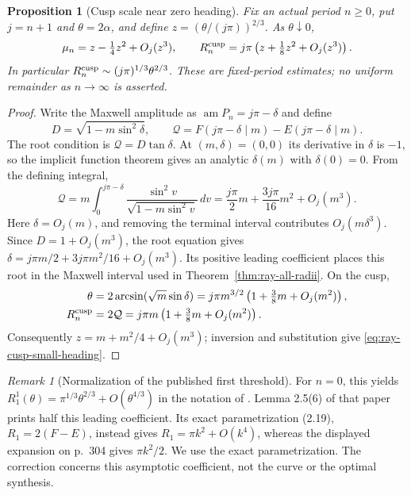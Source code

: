 \documentclass[11pt,a4paper]{article}
\newtheorem{proposition}[theorem]{Proposition}
\theoremstyle{remark}\newtheorem{remark}[theorem]{Remark}
\begin{document}
\begin{proposition}[Cusp scale near zero heading]\label{prop:ray-cusp-scale}
Fix an actual period $n\ge0$, put $j=n+1$ and $\theta=2\alpha$,
and define $z=(\theta/(j\pi))^{2/3}$. As $\theta\downarrow0$,
\begin{equation}\label{eq:ray-cusp-small-heading}
 \mu_n=z-\tfrac14z^2+O_j(z^3),\qquad
 R_n^{\rm cusp}=j\pi\left(z+\tfrac18z^2+O_j(z^3)\right).
\end{equation}
In particular $R_n^{\rm cusp}\sim(j\pi)^{1/3}\theta^{2/3}$.
These are fixed-period estimates; no uniform remainder as $n\to\infty$
is asserted.
\end{proposition}
\begin{proof}
Write the Maxwell amplitude as
$\operatorname{am}P_n=j\pi-\delta$ and define
\[
 D=\sqrt{1-m\sin^2\delta},\qquad
 \mathcal Q=F(j\pi-\delta\mid m)-E(j\pi-\delta\mid m).
\]
The root condition is $\mathcal Q=D\tan\delta$.
At $(m,\delta)=(0,0)$ its derivative in $\delta$ is $-1$,
so the implicit function theorem gives an analytic $\delta(m)$
with $\delta(0)=0$. From the defining integral,
\[
 \mathcal Q=m\int_0^{j\pi-\delta}
       \frac{\sin^2 v}{\sqrt{1-m\sin^2 v}}\,dv
 =\frac{j\pi}{2}m+\frac{3j\pi}{16}m^2+O_j(m^3).
\]
Here $\delta=O_j(m)$, and removing the terminal interval contributes
$O_j(m\delta^3)$. Since $D=1+O_j(m^3)$, the root equation gives
$\delta=j\pi m/2+3j\pi m^2/16+O_j(m^3)$.
Its positive leading coefficient places this root in the Maxwell
interval used in Theorem~\ref{thm:ray-all-radii}. On the cusp,
\[
 \begin{aligned}
 \theta&=2\arcsin(\sqrt m\sin\delta)
 =j\pi m^{3/2}\left(1+\tfrac38m+O_j(m^2)\right),\\
 R_n^{\rm cusp}&=2\mathcal Q
 =j\pi m\left(1+\tfrac38m+O_j(m^2)\right).
 \end{aligned}
\]
Consequently $z=m+m^2/4+O_j(m^3)$; inversion and substitution
give \eqref{eq:ray-cusp-small-heading}.
\end{proof}
\begin{remark}[Normalization of the published first threshold]
For $n=0$, this yields
$R_1^1(\theta)=\pi^{1/3}\theta^{2/3}+O(\theta^{4/3})$
in the notation of \cite{SS}. Lemma 2.5(6) of that paper prints
half this leading coefficient. Its exact parametrization (2.19),
$R_1=2(F-E)$, instead gives $R_1=\pi k^2+O(k^4)$,
whereas the displayed expansion on p.~304 gives $\pi k^2/2$.
We use the exact parametrization. The correction concerns this
asymptotic coefficient, not the curve or the optimal synthesis.
\end{remark}
\end{document}
